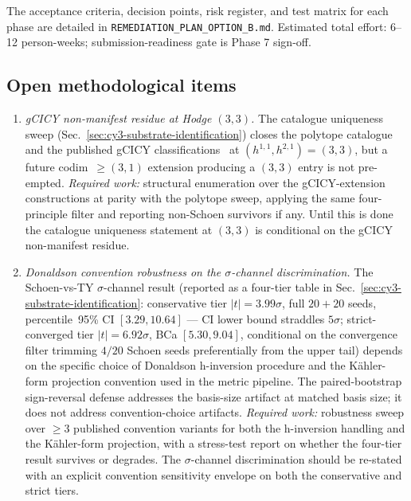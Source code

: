 ﻿\documentclass[reprint,amsmath,amssymb,aps,prd,longbibliography,floatfix]{revtex4-2}
\begin{document}
The acceptance criteria, decision points, risk register, and test
matrix for each phase are detailed in
\texttt{REMEDIATION\_PLAN\_OPTION\_B.md}. Estimated total effort: 6--12
person-weeks; submission-readiness gate is Phase 7 sign-off.

\subsection{Open methodological items}
\label{subsec:open-method}

\begin{enumerate}
\item \emph{gCICY non-manifest residue at Hodge $(3,3)$.} The
catalogue uniqueness sweep
(Sec.~\ref{sec:cy3-substrate-identification}) closes the polytope
catalogue~\cite{KreuzerSkarke2002} and the published gCICY
classifications~\cite{AndersonApruzziGaoGrayLee2015,LarforsLukas2020,ConstantinLukasManuwal2016}
at $(h^{1,1},h^{2,1})=(3,3)$, but a future codim~$\ge (3,1)$
extension producing a $(3,3)$ entry is not pre-empted. \emph{Required
work:} structural enumeration over the gCICY-extension constructions
at parity with the polytope sweep, applying the same four-principle
filter and reporting non-Schoen survivors if any. Until this is done
the catalogue uniqueness statement at $(3,3)$ is conditional on the
gCICY non-manifest residue.

\item \emph{Donaldson convention robustness on the $\sigma$-channel
discrimination.} The Schoen-vs-TY $\sigma$-channel result
(reported as a four-tier table in
Sec.~\ref{sec:cy3-substrate-identification}: conservative tier
$|t| = 3.99\sigma$, full $20{+}20$ seeds, percentile~95\% CI
$[3.29, 10.64]$ — CI lower bound straddles $5\sigma$;
strict-converged tier $|t| = 6.92\sigma$, BCa $[5.30, 9.04]$,
conditional on the convergence filter trimming $4/20$ Schoen
seeds preferentially from the upper tail) depends on the
specific choice of Donaldson h-inversion procedure and the
Kähler-form projection convention used in the metric pipeline.
The paired-bootstrap sign-reversal defense addresses the
basis-size artifact at matched basis size; it does not address
convention-choice artifacts. \emph{Required work:} robustness
sweep over $\geq 3$ published convention variants for both the
h-inversion handling and the Kähler-form projection, with a
stress-test report on whether the four-tier result survives or
degrades. The $\sigma$-channel discrimination should be
re-stated with an explicit convention sensitivity envelope on
both the conservative and strict tiers.


\end{enumerate}
\end{document}
